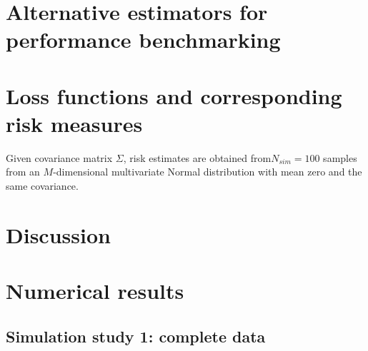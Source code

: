 \documentclass[12pt]{article}
\theoremstyle{definition}
\begin{document}
\bigskip



\section{Alternative estimators for performance benchmarking}


\section{Loss functions and corresponding risk measures}


Given covariance matrix $\Sigma$, risk estimates are obtained from$N_{sim} = 100$ samples from an $M$-dimensional multivariate Normal distribution with mean zero and the same covariance.

\section{Discussion}




\bigskip


\section{Numerical results}
\subsection{Simulation study 1: complete data}

\setlength{\dashlinedash}{0.5pt}
\setlength{\dashlinegap}{1pt}
\setlength{\arrayrulewidth}{0.2pt}
\end{document}
